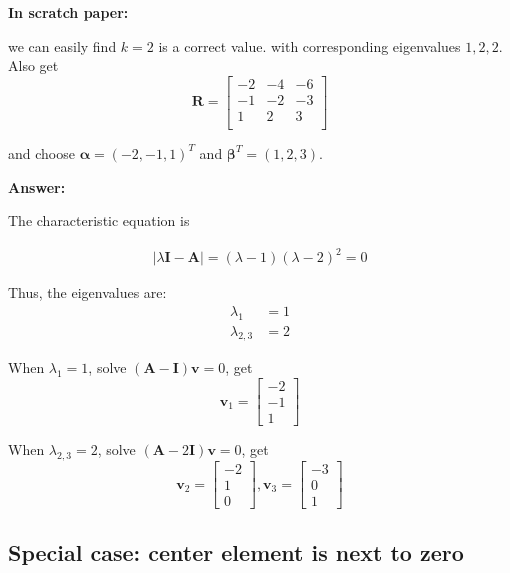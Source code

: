 \documentclass{article}
\begin{document}
\textbf{In scratch paper:}

we can easily find \( k = 2 \) is a correct value.
with corresponding eigenvalues $1,2,2$. Also get 
\[\boldsymbol R = \begin{bmatrix}
	-2 & -4 & -6\\
	-1 & -2 & -3\\
	1 & 2 & 3\\
\end{bmatrix}
\]

and choose $\boldsymbol\alpha = (-2,-1,1)^{T}$ and $\boldsymbol\beta^{T} = (1,2,3)$.

\textbf{Answer:} 

The characteristic equation is

\[
	\begin{array}{c}
		|\lambda \boldsymbol I - \boldsymbol A| =
		(\lambda - 1)(\lambda - 2)^2 = 0
\end{array}
\] 

Thus, the eigenvalues are:
\[
\begin{aligned}
	\lambda_1 &= 1 \\
	\lambda_{2,3} &= 2
\end{aligned}
\]

When \( \lambda_1 = 1 \), solve \( (\boldsymbol A - \boldsymbol I) \boldsymbol v = 0 \), get
\[
\boldsymbol v_1 = \begin{bmatrix}
	-2 \\ -1 \\ 1
\end{bmatrix}
\]

When \( \lambda_{2,3} = 2 \), solve \( (\boldsymbol A - 2\boldsymbol I) \boldsymbol v = 0 \), get
\[
\boldsymbol v_2 = \begin{bmatrix}
	-2 \\ 1 \\ 0
\end{bmatrix}, 
\boldsymbol v_3 = \begin{bmatrix}
	-3 \\ 0 \\ 1
\end{bmatrix}
\]

\subsection{Special case: center element is next to zero}
\end{document}
